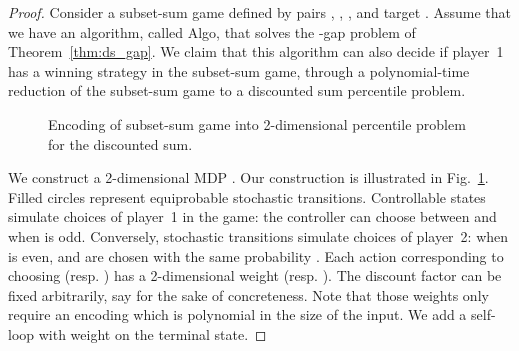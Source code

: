 \documentclass{llncs}
\begin{document}
\begin{proof}
Consider a subset-sum game defined by pairs , , , and target . Assume that we have an algorithm, called \textsf{Algo}, that solves the -gap problem of Theorem~\ref{thm:ds_gap}. We claim that this algorithm can also decide if player~1 has a winning strategy in the subset-sum game, through a polynomial-time reduction of the subset-sum game to a discounted sum percentile problem.

\begin{figure}[tb]
        \centering
        \caption{Encoding of subset-sum game into 2-dimensional percentile problem for the discounted sum.}\label{fig:ds_subset}
\end{figure}

We construct a 2-dimensional MDP . Our construction is illustrated in Fig.~\ref{fig:ds_subset}. Filled circles represent equiprobable stochastic transitions. Controllable states simulate choices of player~1 in the game: the controller can choose between  and  when  is odd. Conversely, stochastic transitions simulate choices of player~2: when  is even,  and  are chosen with the same probability . Each action corresponding to choosing  (resp. ) has a 2-dimensional weight  (resp. ). The discount factor can be fixed arbitrarily, say  for the sake of concreteness. Note that those weights only require an encoding which is polynomial in the size of the input. We add a self-loop with weight  on the terminal state.


\end{proof}
\end{document}
